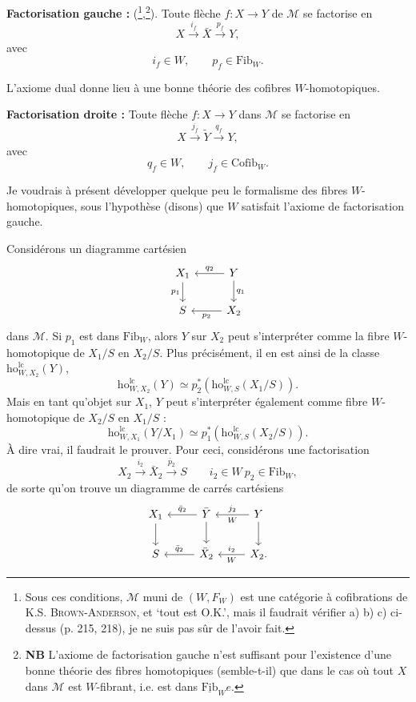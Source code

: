\documentclass[11pt]{article}
\newcommand{\printedpage}[1]{\marginpar{\footnotesize p.~#1}}
\newcommand{\msp}[1]{\marginpar{\footnotesize [#1]}}
\newcommand{\Fibu}{\underline{\mathrm{Fib}}}
\newcommand{\ho}{\mathrm{ho}}
\newcommand{\lc}{\mathrm{lc}}
\begin{document}
\textbf{Factorisation gauche :} (\footnote[129]{Sous ces conditions, $\mathcal{M}$ muni de $(W, F_W)$ est une catégorie à cofibrations de K.S. \textsc{Brown-Anderson}, et `tout est O.K.', mais il faudrait vérifier a) b) c) ci-dessus (p. 215, 218), je ne suis pas sûr de l'avoir fait.},\footnote[130]{\textbf{NB} L'axiome de factorisation gauche n'est suffisant pour l'existence d'une bonne théorie des fibres homotopiques (semble-t-il) que dans le cas où tout $X$ dans $\mathcal{M}$ est $W$-fibrant, i.e. est dans $\Fibu_W e$.}). Toute flèche $f : X \longrightarrow Y$ de $\mathcal{M}$ se factorise en
\[
X \xrightarrow{i_f} \bar{X} \xrightarrow{p_f} Y,
\]
avec
\[
i_f \in W, \qquad p_f \in \mathrm{Fib}_W.
\]

L'axiome dual donne lieu à une bonne théorie des cofibres $W$-homotopiques.

\textbf{Factorisation droite :} Toute flèche $f : X \longrightarrow Y$ dans $\mathcal{M}$ se factorise en
\[
X \xrightarrow{j_f} \tilde{Y} \xrightarrow{q_f} Y,
\]
avec
\[
q_f \in W, \qquad j_f \in \mathrm{Cofib}_W.
\]

\msp{page 241}
Je voudrais à présent développer quelque peu le formalisme des fibres $W$-homotopiques, sous l'hypothèse (disons) que $W$ satisfait l'axiome de factorisation gauche.

Considérons un diagramme cartésien
\[
\begin{tikzcd}[ampersand replacement=\&]
X_1 \arrow[d, "p_1"'] \& Y \arrow[l, "q_2"'] \arrow[d, "q_1"] \\
S \& X_2 \arrow[l, "p_2"]
\end{tikzcd}
\]
\printedpage{156}
dans $\mathcal{M}$. Si $p_1$ est dans $\mathrm{Fib}_W$, alors $Y$ sur $X_2$ peut s'interpréter comme la fibre $W$-homotopique de $X_1/S$ en $X_2/S$. Plus précisément, il en est ainsi de la classe $\ho^{\lc}_{W,X_2}(Y)$,
\[
\ho^{\lc}_{W,X_2}(Y) \simeq p_2^*(\ho^{\lc}_{W,S}(X_1/S)). \tag*{$(*)$}
\]
Mais en tant qu'objet sur $X_1$, $Y$ peut s'interpréter également comme fibre $W$-homotopique de $X_2/S$ en $X_1/S$ :
\[
\ho^{\lc}_{W,X_1}(Y/X_1) \simeq p_1^*(\ho^{\lc}_{W,S}(X_2/S)). \tag*{$(**)$}
\]
À dire vrai, il faudrait le prouver. Pour ceci, considérons une factorisation
\[
X_2 \xrightarrow{i_2} \bar{X}_2 \xrightarrow{\bar{p}_2} S \qquad i_2 \in W\ p_2 \in \mathrm{Fib}_W, %
\]
de sorte qu'on trouve un diagramme de carrés cartésiens
\[
\begin{tikzcd}[ampersand replacement=\&]
X_1 \arrow[d] \& \bar{Y} \arrow[l, "\bar{q}_2"'] \arrow[d] \& Y \arrow[l, "j_2"', "W"] \arrow[d] \\
S \& \bar{X}_2 \arrow[l, "\bar{q}_2"'] \& X_2. \arrow[l, "i_2"', "W"] %
\end{tikzcd}
\]
\end{document}
